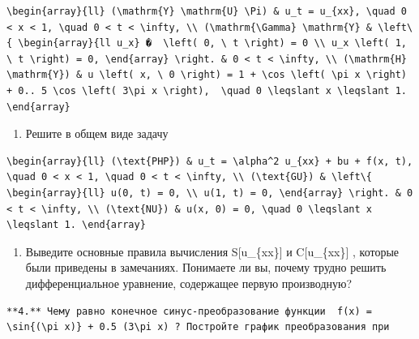 \documentclass[
  ukrainian,
]{article}
\providecommand{\tightlist}{%
  \setlength{\itemsep}{0pt}\setlength{\parskip}{0pt}}
\begin{document}
\begin{verbatim}
\begin{array}{ll} (\mathrm{Y} \mathrm{U} \Pi) & u_t = u_{xx}, \quad 0 < x < 1, \quad 0 < t < \infty, \\ (\mathrm{\Gamma} \mathrm{Y} & \left\{ \begin{array}{ll u_x} �  \left( 0, \ t \right) = 0 \\ u_x \left( 1, \ t \right) = 0, \end{array} \right. & 0 < t < \infty, \\ (\mathrm{H} \mathrm{Y}) & u \left( x, \ 0 \right) = 1 + \cos \left( \pi x \right) + 0.. 5 \cos \left( 3\pi x \right),  \quad 0 \leqslant x \leqslant 1. \end{array}
\end{verbatim}

\begin{enumerate}
\def\labelenumi{\arabic{enumi}.}
\setcounter{enumi}{1}
\tightlist
\item
  Решите в общем виде задачу
\end{enumerate}

\begin{verbatim}
\begin{array}{ll} (\text{PHP}) & u_t = \alpha^2 u_{xx} + bu + f(x, t), \quad 0 < x < 1, \quad 0 < t < \infty, \\ (\text{GU}) & \left\{ \begin{array}{ll} u(0, t) = 0, \\ u(1, t) = 0, \end{array} \right. & 0 < t < \infty, \\ (\text{NU}) & u(x, 0) = 0, \quad 0 \leqslant x \leqslant 1. \end{array}
\end{verbatim}

\begin{enumerate}
\def\labelenumi{\arabic{enumi}.}
\setcounter{enumi}{2}
\tightlist
\item
  Выведите основные правила вычисления S{[}u\_\{xx\}{]} и
  C{[}u\_\{xx\}{]} , которые были приведены в замечаниях. Понимаете ли
  вы, почему трудно решить дифференциальное уравнение, содержащее первую
  производную?
\end{enumerate}

\begin{verbatim}
**4.** Чему равно конечное синус-преобразование функции  f(x) = \sin{(\pi x)} + 0.5 (3\pi x) ? Постройте график преобразования при
\end{verbatim}
\end{document}
